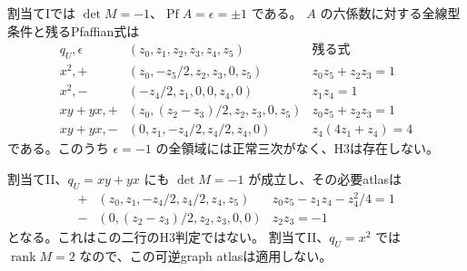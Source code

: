 \begin{proposition}[tangent必要atlasと割当てIの負Pfaffian完全排除]
\label{prop:h3-order2-22-tangent-minus-empty}
割当てIでは $\det M=-1$、$\operatorname{Pf}A=\epsilon=\pm1$ である。
$A$ の六係数に対する全線型条件と残るPfaffian式は
\[
\begin{array}{c|c|c}
 q_U,\epsilon&(z_0,z_1,z_2,z_3,z_4,z_5)&\text{残る式}\\\hline
 x^2,+&(z_0,-z_5/2,z_2,z_3,0,z_5)&z_0z_5+z_2z_3=1\\
 x^2,-&(-z_4/2,z_1,0,0,z_4,0)&z_1z_4=1\\
 xy+yx,+&(z_0,(z_2-z_3)/2,z_2,z_3,0,z_5)&z_0z_5+z_2z_3=1\\
 xy+yx,-&(0,z_1,-z_4/2,z_4/2,z_4,0)&z_4(4z_1+z_4)=4
\end{array}
\]
である。このうち $\epsilon=-1$ の全領域には正常三次がなく、H3は存在しない。

割当てII、$q_U=xy+yx$ にも $\det M=-1$ が成立し、その必要atlasは
\[
\begin{array}{c|c|c}
 +&(z_0,z_1,-z_4/2,z_4/2,z_4,z_5)&z_0z_5-z_1z_4-z_4^2/4=1\\
 -&(0,(z_2-z_3)/2,z_2,z_3,0,0)&z_2z_3=-1
\end{array}
\]
となる。これはこの二行のH3判定ではない。
割当てII、$q_U=x^2$ では $\operatorname{rank}M=2$ なので、この可逆graph atlasは適用しない。
\end{proposition}
